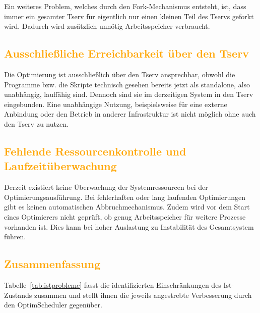 \documentclass[
    12pt,               
    a4paper,            
    ngerman,            
    parskip=half,       
    headings=normal,   
    numbers=enddot,     
    toc=chapterentrywithdots 
]{scrreprt}\usepackage[utf8]{inputenc}
\begin{document}
Ein weiteres Problem, welches durch den Fork-Mechanismus entsteht, ist, dass immer ein gesamter Tserv für eigentlich nur einen kleinen Teil des Tservs geforkt wird. Dadurch wird zusätzlich unnötig Arbeitsspeicher verbraucht.

\subsection{\textcolor{orange}{Ausschließliche Erreichbarkeit über den Tserv}}
Die Optimierung ist ausschließlich über den Tserv ansprechbar, obwohl die Programme bzw. die Skripte technisch gesehen bereits jetzt als standalone, also unabhängig, lauffähig sind. Dennoch sind sie im derzeitigen System in den Tserv eingebunden. Eine unabhängige Nutzung, beispielsweise für eine externe Anbindung oder den Betrieb in anderer Infrastruktur ist nicht möglich ohne auch den Tserv zu nutzen.

\subsection{\textcolor{orange}{Fehlende Ressourcenkontrolle und Laufzeitüberwachung}}
Derzeit existiert keine Überwachung der Systemressourcen bei der Optimierungsausführung. Bei fehlerhaften oder lang laufenden Optimierungen gibt es keinen automatischen Abbruchmechanismus. Zudem wird vor dem Start eines Optimierers nicht geprüft, ob genug Arbeitsspeicher für weitere Prozesse vorhanden ist. Dies kann bei hoher Auslastung zu Instabilität des Gesamtsystem führen.

\subsection{\textcolor{orange}{Zusammenfassung}}

Tabelle~\ref{tab:istprobleme} fasst die identifizierten Einschränkungen des Ist-Zustands zusammen und stellt ihnen die jeweils angestrebte Verbesserung durch den OptimScheduler gegenüber.
\end{document}
